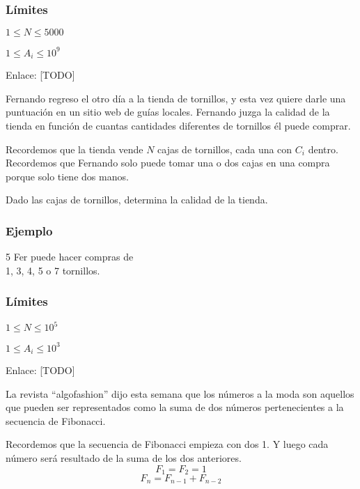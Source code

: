 \subsubsection*{Límites}
\begin{plimits}
	\item \(1\leq N \leq 5000\)
	\item \(1\leq A_i \leq 10^9\)
\end{plimits}

Enlace: [TODO]

\problembreak

\problemtitle Fernando regreso el otro día a la tienda de tornillos, y esta vez quiere darle una puntuación en un sitio web de guías locales. Fernando juzga la calidad de la tienda en función de cuantas cantidades diferentes de tornillos él puede comprar.

Recordemos que la tienda vende \(N\) cajas de tornillos, cada una con \(C_i\) dentro. Recordemos que Fernando solo puede tomar una o dos cajas en una compra porque solo tiene dos manos.

Dado las cajas de tornillos, determina la calidad de la tienda.

\subsubsection{Ejemplo}
\begin{casebox3}
	{5}
	{
	   Fer puede hacer compras de \\
	   1, 3, 4, 5 o 7 tornillos.
	}
\end{casebox3}

\subsubsection*{Límites}
\begin{plimits}
	\item \(1\leq N \leq 10^5\)
	\item \(1\leq A_i \leq 10^3\)
\end{plimits}

Enlace: [TODO]

\problembreak

\problemtitle La revista “algofashion” dijo esta semana que los números a la moda son aquellos que pueden ser representados como la suma de dos números pertenecientes a la secuencia de Fibonacci.

Recordemos que la secuencia de Fibonacci empieza con dos 1. Y luego cada número será resultado de la suma de los dos anteriores.
\[F_1=F_2=1\]
\[F_n=F_{n-1}+F_{n-2}\]

